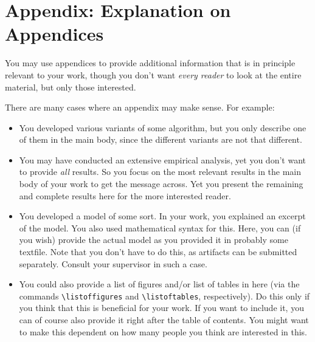 \chapter{Appendix: Explanation on Appendices}\label{chap:appendix1}

You may use appendices to provide additional information that is in principle relevant to your work, though you don't want \emph{every reader} to look at the entire material, but only those interested.

There are many cases where an appendix may make sense. For example:
\begin{itemize}
  \item You developed various variants of some algorithm, but you only describe one of them in the main body, since the different variants are not that different.
  \item You may have conducted an extensive empirical analysis, yet you don't want to provide \emph{all} results. So you focus on the most relevant results in the main body of your work to get the message across. Yet you present the remaining and complete results here for the more interested reader.
  \item You developed a model of some sort. In your work, you explained an excerpt of the model. You also used mathematical syntax for this. Here, you can (if you wish) provide the actual model as you provided it in probably some textfile. Note that you don't have to do this, as artifacts can be submitted separately. Consult your supervisor in such a case.
  \item You could also provide a list of figures and/or list of tables in here (via the commands \verb!\listoffigures! and \verb!\listoftables!, respectively). Do this only if you think that this is beneficial for your work. If you want to include it, you can of course also provide it right after the table of contents. You might want to make this dependent on how many people you think are interested in this.
\end{itemize}
